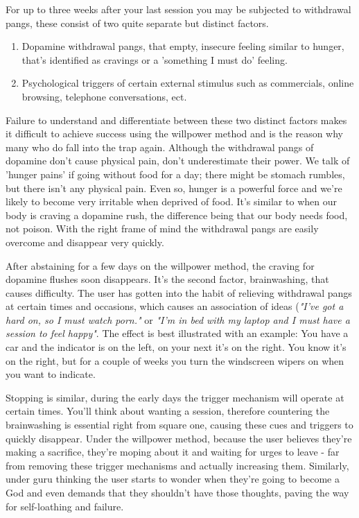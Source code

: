 \documentclass[easypeasy.tex]{subfiles}
\begin{document}
For up to three weeks after your last session you may be subjected to withdrawal pangs, these consist of two quite separate but distinct factors.
\begin{enumerate}
  \item Dopamine withdrawal pangs, that empty, insecure feeling similar to hunger, that's identified as cravings or a 'something I must do' feeling.

  \item Psychological triggers of certain external stimulus such as commercials, online browsing, telephone conversations, ect.
\end{enumerate}

Failure to understand and differentiate between these two distinct factors makes it difficult to achieve success using the willpower method and is the reason why many who do fall into the trap again. Although the withdrawal pangs of dopamine don't cause physical pain, don't underestimate their power. We talk of 'hunger pains' if going without food for a day; there might be stomach rumbles, but there isn't any physical pain. Even so, hunger is a powerful force and we're likely to become very irritable when deprived of food. It's similar to when our body is craving a dopamine rush, the difference being that our body needs food, not poison. With the right frame of mind the withdrawal pangs are easily overcome and disappear very quickly.

After abstaining for a few days on the willpower method, the craving for dopamine flushes soon disappears. It's the second factor, brainwashing, that causes difficulty. The user has gotten into the habit of relieving withdrawal pangs at certain times and occasions, which causes an association of ideas (\textit{"I've got a hard on, so I must watch porn."} or \textit{"I'm in bed with my laptop and I must have a session to feel happy"}. The effect is best illustrated with an example: You have a car and the indicator is on the left, on your next it's on the right. You know it's on the right, but for a couple of weeks you turn the windscreen wipers on when you want to indicate.

Stopping is similar, during the early days the trigger mechanism will operate at certain times. You'll think about wanting a session, therefore countering the brainwashing is essential right from square one, causing these cues and triggers to quickly disappear. Under the willpower method, because the user believes they're making a sacrifice, they're moping about it and waiting for urges to leave - far from removing these trigger mechanisms and actually increasing them. Similarly, under guru thinking the user starts to wonder when they're going to become a God and even demands that they shouldn't have those thoughts, paving the way for self-loathing and failure.
\end{document}
